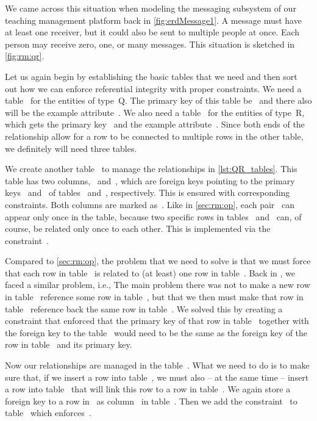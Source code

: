 We came across this situation when modeling the messaging subsystem of our teaching management platform back in \cref{fig:erdMessage1}.
A message must have at least one receiver, but it could also be sent to multiple people at once.
Each person may receive zero, one, or many messages.
This situation is sketched in \cref{fig:rm:qr}.

Let us again begin by establishing the basic tables that we need and then sort out how we can enforce referential integrity with proper constraints.
We need a table~ for the entities of type~Q.
The primary key of this table be~ and there also will be the example attribute~.
We also need a table~ for the entities of type~R, which gets the primary key~ and the example attribute~.
Since both ends of the relationship allow for a row to be connected to multiple rows in the other table, we definitely will need three tables.

We create another table~ to manage the relationships in \cref{lst:QR_tables}.
This table has two columns,~ and~, which are foreign keys pointing to the primary keys~ and~ of tables~ and~, respectively.
This is ensured with corresponding  constraints.
Both columns are marked as~.
Like in \cref{sec:rm:op}, each pair~ can appear only once in the table, because two specific rows in tables~ and~ can, of course, be related only once to each other.
This is implemented via the constraint~.

Compared to \cref{sec:rm:op}, the problem that we need to solve is that we must force that each row in table~ is related to (at least) one row in table~.
Back in , we faced a similar problem, i.e., 
The main problem there was not to make a new row in table~ reference some row in table~, but that we then must make that row in table~ reference back the same row in table~.
We solved this by creating a constraint that enforced that the primary key of that row in table~ together with the foreign key to the table~ would need to be the same as the foreign key of the row in table~ and its primary key.

Now our relationships are managed in the table~.
What we need to do is to make sure that, if we insert a row into table~, we must also -- at the same time -- insert a row into table~ that will link this row to a row in table~.
We again store a  foreign key to a row in~ as column~ in table~.
Then we add the constraint~ to table~ which enforces~.

